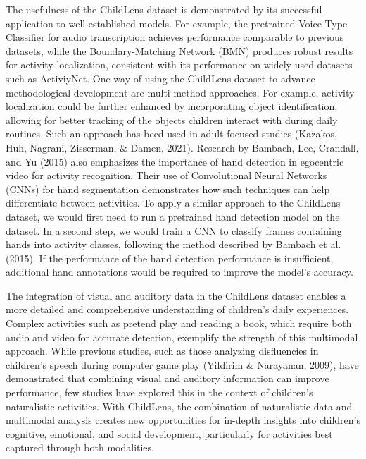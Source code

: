 \documentclass[
  man,floatsintext]{apa6}
\begin{document}
The usefulness of the ChildLens dataset is demonstrated by its successful application to well-established models. For example, the pretrained Voice-Type Classifier for audio transcription achieves performance comparable to previous datasets, while the Boundary-Matching Network (BMN) produces robust results for activity localization, consistent with its performance on widely used datasets such as ActiviyNet. One way of using the ChildLens dataset to advance methodological development are multi-method approaches. For example, activity localization could be further enhanced by incorporating object identification, allowing for better tracking of the objects children interact with during daily routines. Such an approach has beed used in adult-focused studies (Kazakos, Huh, Nagrani, Zisserman, \& Damen, 2021). Research by Bambach, Lee, Crandall, and Yu (2015) also emphasizes the importance of hand detection in egocentric video for activity recognition. Their use of Convolutional Neural Networks (CNNs) for hand segmentation demonstrates how such techniques can help differentiate between activities. To apply a similar approach to the ChildLens dataset, we would first need to run a pretrained hand detection model on the dataset. In a second step, we would train a CNN to classify frames containing hands into activity classes, following the method described by Bambach et al. (2015). If the performance of the hand detection performance is insufficient, additional hand annotations would be required to improve the model's accuracy.

The integration of visual and auditory data in the ChildLens dataset enables a more detailed and comprehensive understanding of children's daily experiences. Complex activities such as pretend play and reading a book, which require both audio and video for accurate detection, exemplify the strength of this multimodal approach. While previous studies, such as those analyzing disfluencies in children's speech during computer game play (Yildirim \& Narayanan, 2009), have demonstrated that combining visual and auditory information can improve performance, few studies have explored this in the context of children's naturalistic activities. With ChildLens, the combination of naturalistic data and multimodal analysis creates new opportunities for in-depth insights into children's cognitive, emotional, and social development, particularly for activities best captured through both modalities.
\end{document}

